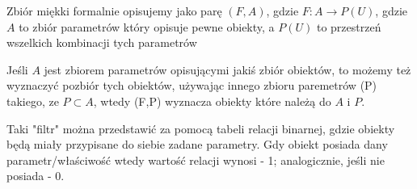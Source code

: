 \documentclass{article}
\begin{document}
Zbiór miękki formalnie opisujemy jako parę $(F,A)$, gdzie $F: A \rightarrow P(U)$, gdzie $A$ to zbiór parametrów który opisuje pewne obiekty, a $P(U)$ to przestrzeń wszelkich kombinacji tych parametrów

Jeśli $A$ jest zbiorem parametrów opisującymi jakiś zbiór obiektów, to możemy też wyznaczyć pozbiór tych obiektów, używając innego zbioru paremetrów (P) takiego, ze $P \subset A$, wtedy (F,P) wyznacza obiekty które należą do $A$ i $P$.

Taki "filtr" można przedstawić za pomocą tabeli relacji binarnej, gdzie obiekty będą miały przypisane do siebie zadane parametry. Gdy obiekt posiada
dany parametr/właściwość wtedy wartość relacji wynosi - 1; analogicznie, jeśli nie posiada - 0.
\end{document}
